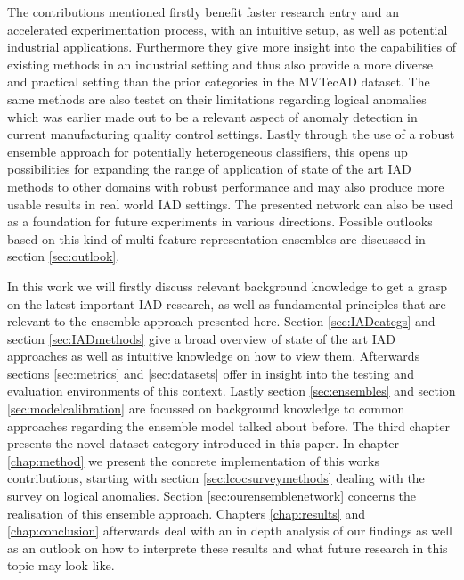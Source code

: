 The contributions mentioned firstly benefit faster research entry and an accelerated experimentation process, with an intuitive setup, 
as well as potential industrial applications. 
Furthermore they give more insight into the capabilities of existing methods in an industrial setting and thus also provide a more 
diverse and practical setting than the prior categories in the MVTecAD \cite{LOCODentsAndScratchesBergmann2022} dataset. The same methods are also testet on their limitations 
regarding logical anomalies which was earlier made out to be a relevant aspect of anomaly detection in current manufacturing quality control 
settings. Lastly through the use of a robust ensemble approach for potentially heterogeneous classifiers, this opens up possibilities for expanding 
the range of application of state of the art IAD methods to other domains with robust performance and may also produce more usable results in real 
world IAD settings. The presented network can also be used as a foundation for future experiments in 
various directions. Possible outlooks based on this kind of multi-feature representation ensembles are discussed in section \ref{sec:outlook}.
\newline
\newline

In this work we will firstly discuss relevant background knowledge to get a grasp on the latest important IAD research, as well as fundamental principles that are relevant to the ensemble 
approach presented here. Section \ref{sec:IADcategs} and section \ref{sec:IADmethods} give a broad overview of state of the art IAD approaches as well as intuitive knowledge on how to 
view them. Afterwards sections \ref{sec:metrics} and \ref{sec:datasets} offer in insight into the testing and evaluation environments of this context. Lastly section \ref{sec:ensembles} and 
section \ref{sec:modelcalibration} are focussed on background knowledge to common approaches regarding the ensemble model talked about before.\newline
The third chapter presents the novel dataset category introduced in this paper.
In chapter \ref{chap:method} we present the concrete implementation of this works contributions, starting with section \ref{sec:lcocsurveymethods} dealing with the survey on logical anomalies. 
Section \ref{sec:ourensemblenetwork} concerns the realisation of this ensemble approach.
\newline 
Chapters \ref{chap:results} and \ref{chap:conclusion} afterwards deal with an in depth analysis of our findings as well as an outlook on how to interprete these results and what future research 
in this topic may look like.






